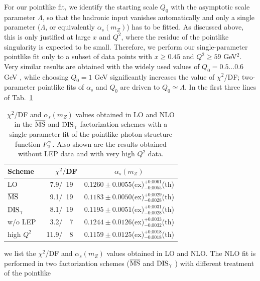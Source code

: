 \documentclass[aps,prl,twocolumn,groupedaddress]{revtex4}
\begin{document}
For our pointlike fit, we identify the starting scale $Q_0$ with the asymptotic
scale parameter $\Lambda$, so that the hadronic input vanishes automatically
and only a single parameter ($\Lambda$, or equivalently $\alpha_s(m_Z)$) has to
be fitted. As discussed above, this is only justified at large $x$ and $Q^2$,
where the residue of the pointlike singularity is expected to be small.
Therefore, we perform our single-parameter pointlike fit only to a subset of
data points with $x\geq 0.45$ and $Q^2\geq59$ GeV$^2$. Very similar results
are obtained with the widely used values of $Q_0=0.5...0.6$ GeV
\cite{Gluck:1992jc,Aurenche:1994in,Schuler:1995fk, Gluck:1999ub}, while
choosing $Q_0=1$ GeV significantly increases the value of $\chi^2$/DF;
two-parameter pointlike fits of $\alpha_s$ and $Q_0$ are driven to
$Q_0\simeq\Lambda$. In the first three lines of Tab.\ \ref{tab:1}
%
\begin{table}
\caption{\label{tab:1}$\chi^2$/DF and $\alpha_s(m_Z)$ values obtained in LO and
         NLO in the $\overline{\rm MS}$ and ${\rm DIS}_\gamma$ factorization schemes with a
         single-parameter fit of
         the pointlike photon structure function $\f2y$. Also shown are the 
         results obtained without LEP data and with very high $Q^2$ data.}
\begin{ruledtabular}
\begin{tabular}{llc}
       Scheme & ~~~$\chi^2/$DF& $\alpha_s(m_Z)$ \\
\hline
       LO     & ~~7.9/~19& $0.1260\pm0.0055$(ex)$^{+0.0061}_{-0.0055}$(th) \\
       $\overline{\rm MS}$  & ~~9.1/~19& $0.1183\pm0.0050$(ex)$^{+0.0029}_{-0.0028}$(th) \\
       ${\rm DIS}_\gamma$& ~~8.1/~19& $0.1195\pm0.0051$(ex)$^{+0.0031}_{-0.0028}$(th) \\
\hline
        w/o LEP &~~3.2/~~7& $0.1244\pm0.0126$(ex)$^{+0.0033}_{-0.0032}$(th) \\
        high $Q^2$ &~11.9/~~8& $0.1159\pm0.0125$(ex)$^{+0.0018}_{-0.0018}$(th) \\
\end{tabular}
\end{ruledtabular}
\end{table}
%
we list the $\chi^2$/DF and $\alpha_s(m_Z)$ values obtained in LO and NLO.
The NLO fit is performed in two factorization schemes ($\overline{\rm MS}$ and
${\rm DIS}_\gamma$ \cite{Gluck:1992ee}) with different treatment of the pointlike
\end{document}
